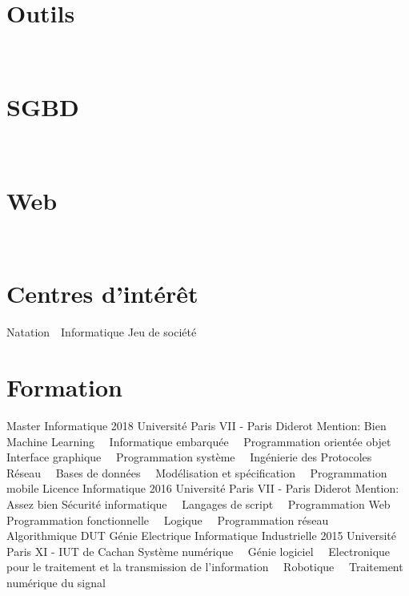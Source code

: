 \documentclass[]{friggeri-cv-custom} %
\begin{document}
\begin{aside}
  \section{Outils}
  ~\textbullet~
  ~\textbullet~~\textbullet~
  ~\textbullet~~\textbullet~
  ~\textbullet~~\textbullet~
  \section{SGBD}
  ~\textbullet~ 
  \section{Web}
  ~\textbullet~~\textbullet~
  ~\textbullet~~\textbullet~
  \section{Centres d'intérêt}
  Natation~\textbullet~Informatique
  Jeu de société
\end{aside}
\vspace{1.75\parskip}
\section{Formation}
\begin{entrylist}
\entry
{Master Informatique}
{2018}
{Université Paris VII - Paris Diderot}
{Mention{:} Bien}
{
	Machine Learning~\textbullet~
	Informatique embarquée~\textbullet~
	Programmation orientée objet~\textbullet~
	Interface graphique~\textbullet~
	Programmation système~\textbullet~
	Ingénierie des Protocoles Réseau~\textbullet~
	Bases de données~\textbullet~
	Modélisation et spécification~\textbullet~
	Programmation mobile
}
\entry
{Licence Informatique}
{2016}
{Université Paris VII - Paris Diderot}
{Mention{:} Assez bien}
{
  Sécurité informatique~\textbullet~
  Langages de script~\textbullet~
  Programmation Web~\textbullet~
  Programmation fonctionnelle~\textbullet~
  Logique~\textbullet~
  Programmation réseau~\textbullet~
  Algorithmique
}
\entry
{DUT Génie Electrique Informatique Industrielle}
{2015}
{Université Paris XI - IUT de Cachan}
{}
{
	Système numérique~\textbullet~
  Génie logiciel~\textbullet~
	Electronique pour le traitement et la transmission de l'information~\textbullet~
	Robotique~\textbullet~
	Traitement numérique du signal
}
\end{entrylist}%
\end{document}
